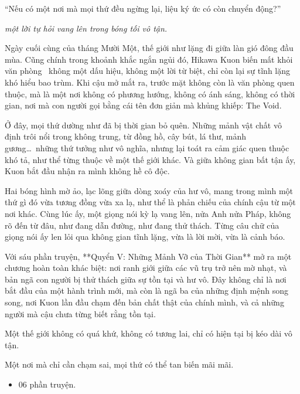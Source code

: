 \documentclass[main.tex]{subfiles}
\begin{document}
\begin{tcolorbox}[
    colframe=vol,  %
    colback=white,   %
    boxrule=0.5pt,   %
    arc=0mm,         %
    left=5pt,        %
    right=5pt,       %
    top=5pt,         %
    bottom=5pt       %
]
``Nếu có một nơi mà mọi thứ đều ngừng lại, liệu ký ức có còn chuyển động?''

\begin{flushright}
    \textit{một lời tự hỏi vang lên trong bóng tối vô tận.}
\end{flushright}
\end{tcolorbox}

Ngày cuối cùng của tháng Mười Một, thế giới như lặng đi giữa làn gió đông đầu mùa. Cũng chính trong khoảnh khắc ngắn ngủi đó, Hikawa Kuon biến mất khỏi văn phòng \hll\ không một dấu hiệu, không một lời từ biệt, chỉ còn lại sự tĩnh lặng khó hiểu bao trùm. Khi cậu mở mắt ra, trước mặt không còn là văn phòng quen thuộc, mà là một nơi không có phương hướng, không có ánh sáng, không có thời gian, nơi mà con người gọi bằng cái tên đơn giản mà khủng khiếp: The Void.

Ở đây, mọi thứ dường như đã bị thời gian bỏ quên. Những mảnh vật chất vô định trôi nổi trong không trung, từ đồng hồ, cây bút, lá thư, mảnh gương\dots\ những thứ tưởng như vô nghĩa, nhưng lại toát ra cảm giác quen thuộc khó tả, như thể từng thuộc về một thế giới khác. Và giữa không gian bất tận ấy, Kuon bắt đầu nhận ra mình không hề cô độc.

Hai bóng hình mờ ảo, lạc lõng giữa dòng xoáy của hư vô, mang trong mình một thứ gì đó vừa tương đồng vừa xa lạ, như thể là phản chiếu của chính cậu từ một nơi khác. Cùng lúc ấy, một giọng nói kỳ lạ vang lên, nửa Anh nửa Pháp, không rõ đến từ đâu, như đang dẫn đường, như đang thử thách. Từng câu chữ của giọng nói ấy len lỏi qua không gian tĩnh lặng, vừa là lời mời, vừa là cảnh báo.

Với sáu phần truyện, **Quyển V: Những Mảnh Vỡ của Thời Gian** mở ra một chương hoàn toàn khác biệt: nơi ranh giới giữa các vũ trụ trở nên mờ nhạt, và bản ngã con người bị thử thách giữa sự tồn tại và hư vô. Đây không chỉ là nơi bắt đầu của một hành trình mới, mà còn là ngã ba của những định mệnh song song, nơi Kuon lần đầu chạm đến bản chất thật của chính mình, và cả những người mà cậu chưa từng biết rằng tồn tại.

Một thế giới không có quá khứ, không có tương lai, chỉ có hiện tại bị kéo dài vô tận.

Một nơi mà chỉ cần chạm sai, mọi thứ có thể tan biến mãi mãi.

{}
\begin{itemize}
\item 06 phần truyện.
\end{itemize}
\end{document}
